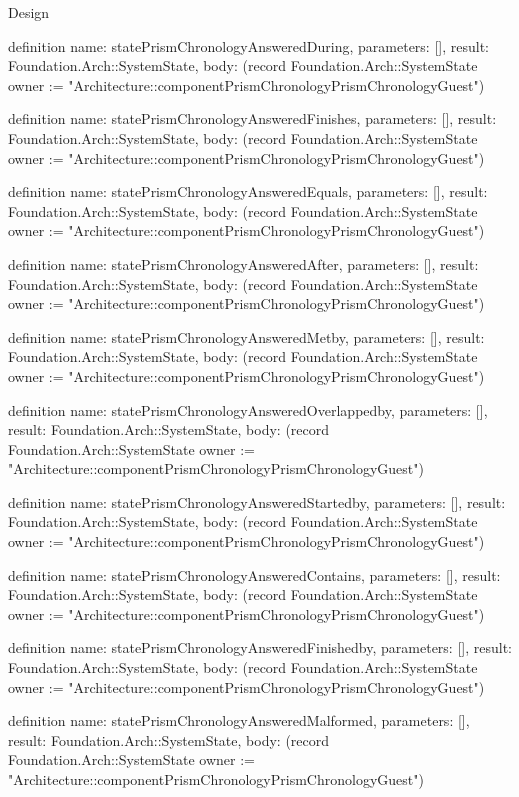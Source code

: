 \begin{lexlean}{Design}
\begin{semanticmodule}
definition{
  name: statePrismChronologyAnsweredDuring,
  parameters: [],
  result: Foundation.Arch::SystemState,
  body: (record Foundation.Arch::SystemState {owner := "Architecture::componentPrismChronologyPrismChronologyGuest"})
}

definition{
  name: statePrismChronologyAnsweredFinishes,
  parameters: [],
  result: Foundation.Arch::SystemState,
  body: (record Foundation.Arch::SystemState {owner := "Architecture::componentPrismChronologyPrismChronologyGuest"})
}

definition{
  name: statePrismChronologyAnsweredEquals,
  parameters: [],
  result: Foundation.Arch::SystemState,
  body: (record Foundation.Arch::SystemState {owner := "Architecture::componentPrismChronologyPrismChronologyGuest"})
}

definition{
  name: statePrismChronologyAnsweredAfter,
  parameters: [],
  result: Foundation.Arch::SystemState,
  body: (record Foundation.Arch::SystemState {owner := "Architecture::componentPrismChronologyPrismChronologyGuest"})
}

definition{
  name: statePrismChronologyAnsweredMetby,
  parameters: [],
  result: Foundation.Arch::SystemState,
  body: (record Foundation.Arch::SystemState {owner := "Architecture::componentPrismChronologyPrismChronologyGuest"})
}

definition{
  name: statePrismChronologyAnsweredOverlappedby,
  parameters: [],
  result: Foundation.Arch::SystemState,
  body: (record Foundation.Arch::SystemState {owner := "Architecture::componentPrismChronologyPrismChronologyGuest"})
}

definition{
  name: statePrismChronologyAnsweredStartedby,
  parameters: [],
  result: Foundation.Arch::SystemState,
  body: (record Foundation.Arch::SystemState {owner := "Architecture::componentPrismChronologyPrismChronologyGuest"})
}

definition{
  name: statePrismChronologyAnsweredContains,
  parameters: [],
  result: Foundation.Arch::SystemState,
  body: (record Foundation.Arch::SystemState {owner := "Architecture::componentPrismChronologyPrismChronologyGuest"})
}

definition{
  name: statePrismChronologyAnsweredFinishedby,
  parameters: [],
  result: Foundation.Arch::SystemState,
  body: (record Foundation.Arch::SystemState {owner := "Architecture::componentPrismChronologyPrismChronologyGuest"})
}

definition{
  name: statePrismChronologyAnsweredMalformed,
  parameters: [],
  result: Foundation.Arch::SystemState,
  body: (record Foundation.Arch::SystemState {owner := "Architecture::componentPrismChronologyPrismChronologyGuest"})
}


\end{semanticmodule}
\end{lexlean}
